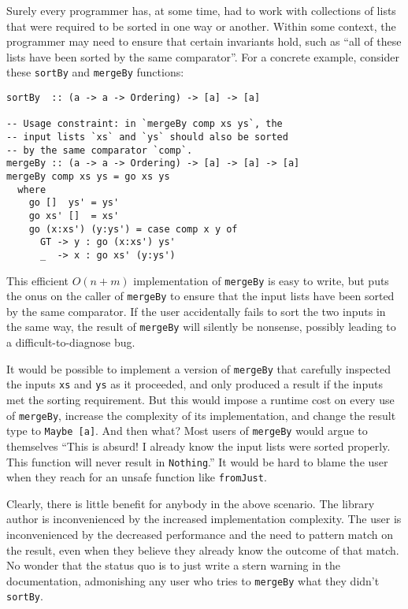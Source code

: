 \documentclass[format=sigplan, review=false, screen=true]{acmart}
\begin{document}
Surely every programmer has, at some time, had to work with collections of
lists that were required to be sorted in one way or another. Within some
context, the programmer may need to ensure that certain invariants hold, such
as ``all of these lists have been sorted by the same comparator''. For a concrete
example, consider these \texttt{sortBy} and \texttt{mergeBy} functions:
\begin{verbatim}
sortBy  :: (a -> a -> Ordering) -> [a] -> [a]

-- Usage constraint: in `mergeBy comp xs ys`, the
-- input lists `xs` and `ys` should also be sorted
-- by the same comparator `comp`.
mergeBy :: (a -> a -> Ordering) -> [a] -> [a] -> [a]
mergeBy comp xs ys = go xs ys
  where
    go []  ys' = ys'
    go xs' []  = xs'
    go (x:xs') (y:ys') = case comp x y of
      GT -> y : go (x:xs') ys'
      _  -> x : go xs' (y:ys')
\end{verbatim}
This efficient $O(n+m)$ implementation of \texttt{mergeBy} is easy to write,
but puts the onus on the caller of \texttt{mergeBy} to ensure that the
input lists have been sorted by the same comparator. If the user accidentally
fails to sort the two inputs in the same way, the result of \texttt{mergeBy}
will silently be nonsense, possibly leading to a difficult-to-diagnose bug.

It would be possible to implement a version of \texttt{mergeBy} that
carefully inspected the inputs \texttt{xs} and \texttt{ys} as it
proceeded, and only produced a result if the inputs met the sorting
requirement. But this would impose a runtime cost on every use of
\texttt{mergeBy}, increase the complexity of its implementation,
and change the result type to \texttt{Maybe [a]}. And then what?
Most users of \texttt{mergeBy} would argue to themselves ``This is
absurd! I already know the input lists were sorted properly. This
function will never result in \texttt{Nothing}.'' It would be hard
to blame the user when they reach for an  unsafe function like
\texttt{fromJust}.

Clearly, there is little benefit for anybody in the above scenario. The
library author is inconvenienced by the increased implementation complexity.
The user is inconvenienced by the decreased performance and the need to
pattern match on the result, even when they believe they already know the
outcome of that match. No wonder that the status quo is to just write
a stern warning in the documentation, admonishing
any user who tries to \texttt{mergeBy} what they didn't \texttt{sortBy}.
\end{document}
